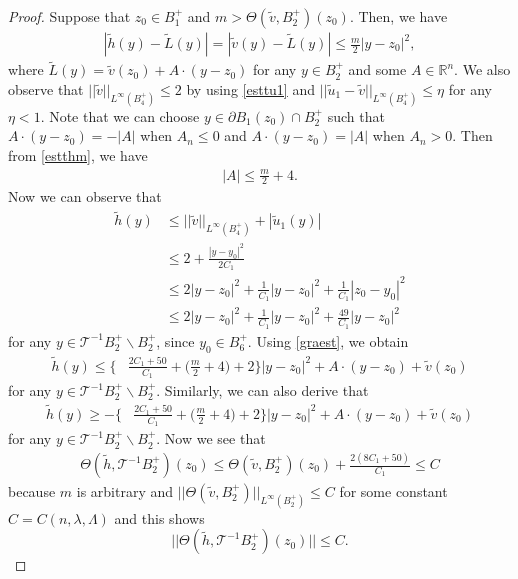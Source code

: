 \documentclass[11pt, reqno]{amsart}
\numberwithin{equation}{section}
\begin{document}
\begin{proof}
Suppose that $z_{0} \in B_{1}^{+}$ and $m>\Theta(\tilde{v},B_{2}^{+})(z_{0})$.
Then, we have
\begin{align} \label{estthm}
|\tilde{h}(y)-\tilde{L}(y)| =| \tilde{v}(y)- \tilde{L}(y)| \le  \frac{m}{2}|y-z_{0}|^{2} ,
\end{align}
where $\tilde{L}(y)= \tilde{v}(z_{0})+A \cdot (y-z_{0})$
for any $y \in B_{2}^{+}$ and some $A \in \mathbb{R}^{n}$.
We also observe that $||\tilde{v}||_{L^{\infty}(B_{4}^{+})} \le 2$ by using \eqref{esttu1} and $||\tilde{u}_{1}-\tilde{v}||_{L^{\infty}(B_{4}^{+})} \le \eta$ for any $\eta <1$.
Note that we can choose $y \in \partial B_{1}(z_{0}) \cap B_{2}^{+}$ such that
$A \cdot (y-z_{0})= -|A|$ when $A_{n} \le 0$ and
$A \cdot (y-z_{0})= |A| $ when $A_{n} > 0$.
Then from \eqref{estthm}, we have
\begin{align} \label{graest}
|A|\le \frac{m}{2}+4.
\end{align}
Now we can observe that
\begin{align*}
\tilde{h}(y)&\le ||\tilde{v}||_{L^{\infty}(B_{4}^{+})}+|\tilde{u}_1(y)|
\\&\le 2+\frac{|y-y_{0}|^{2}}{2C_{1}}
\\ & \le 2|y-z_{0}|^{2}+\frac{1}{C_{1}}|y-z_{0}|^{2}+\frac{1}{C_{1}}|z_{0}-y_{0}|^{2}
\\ & \le 2|y-z_{0}|^{2}+\frac{1}{C_{1}}|y-z_{0}|^{2} + \frac{49}{C_{1}}
|y-z_{0}|^{2}
\end{align*}
for any $y \in \mathcal{T}^{-1}B_{2}^{+}  \backslash B_{2}^{+} $,
since $y_{0} \in B_{6}^{+}$.
Using \eqref{graest}, we obtain
\begin{align*}
\tilde{h}(y)\le
\bigg\{& \frac{2C_{1}+50}{C_{1}} +\bigg(
 \frac{m}{2}+4\bigg)+2 \bigg\}|y-z_{0}|^{2}
  + A\cdot(y-z_{0})+\tilde{v}(z_{0})
\end{align*}
for any $y \in \mathcal{T}^{-1}B_{2}^{+}  \backslash B_{2}^{+} $.
Similarly, we can also derive that
\begin{align*}
\tilde{h}(y)\ge -
\bigg\{& \frac{2C_{1}+50}{C_{1}} +\bigg(
 \frac{m}{2}+4\bigg)+2 \bigg\}|y-z_{0}|^{2}
 + A\cdot(y-z_{0})+\tilde{v}(z_{0})
\end{align*}
for any $y \in \mathcal{T}^{-1}B_{2}^{+}  \backslash B_{2}^{+} $.
Now we see that
\begin{align*}
\Theta(\tilde{h},\mathcal{T}^{-1}B_{2}^{+})(z_{0}) \le
\Theta(\tilde{v},B_{2}^{+})(z_{0})+  \frac{2(8C_{1}+50)}{C_{1}} \le C
\end{align*}
because $m$ is arbitrary and $||\Theta(\tilde{v},B_{2}^{+})||_{L^{\infty}(B_{2}^{+})}\le C$ for some constant
$C=C(n,\lambda,\Lambda )$ and
this shows $$||\Theta(\tilde{h},\mathcal{T}^{-1}B_{2}^{+})(z_{0}) || \le C. $$


\end{proof}
\end{document}
